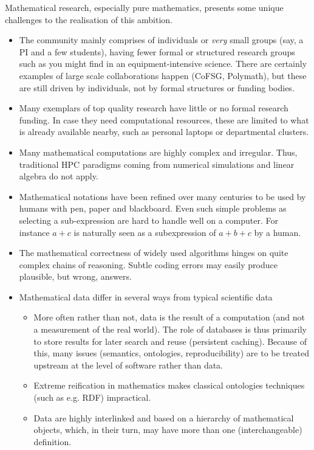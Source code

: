 Mathematical research, especially pure mathematics, presents some
unique challenges to the realisation of this ambition.


\begin{itemize}
\item The community mainly comprises of individuals or \textit{very} small
  groups (say, a PI and a few students), having fewer formal or structured research
  groups such as you might find in an equipment-intensive science. There are 
  certainly examples of large scale collaborations happen (CoFSG, Polymath),
  but these are still driven by individuals, not by formal structures or funding bodies.
\item Many exemplars of top quality research have little or no formal research
  funding. In case they need computational resources, these are limited to what 
  is already available nearby, such as personal laptops or departmental clusters.
\item Many mathematical computations are highly complex and irregular. Thus,
  traditional HPC paradigms coming from numerical simulations and linear algebra do not apply.
\item Mathematical notations have been refined over many centuries to be
  used by humans with pen, paper and blackboard. Even such simple
  problems as selecting a sub-expression are hard to handle well on a
  computer. For instance $a+c$ is naturally seen as a subexpression of
  $a+b+c$ by a human.
\item The mathematical correctness of widely used algorithms hinges on
  quite complex chains of reasoning. Subtle coding errors may easily
  produce plausible, but wrong, answers.

\item Mathematical data differ in several ways from typical
  scientific data
  \begin{itemize}
  \item More often rather than not, data is the result of a computation (and
    not a measurement of the real world). The role of databases is thus primarily
    to store results for later search and reuse (persistent caching). 
    Because of this, many issues (semantics, ontologies,
    reproducibility) are to be treated upstream at the level of
    software rather than data.
  \item Extreme reification in mathematics makes classical ontologies
    techniques (such as e.g. RDF) impractical. 
  \item Data are highly interlinked and based on a hierarchy of mathematical objects,
  which, in their turn, may have more than one (interchangeable) definition.
  \end{itemize}
\end{itemize}


